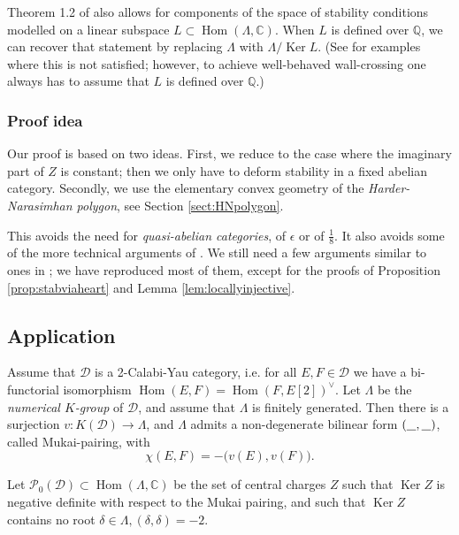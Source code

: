 \documentclass[leqno,11pt,twoside]{amsart}
\theoremstyle{definition}
\begin{document}
Theorem 1.2 of \cite{Bridgeland:Stab} also allows for components of the space of stability
conditions modelled on a linear subspace $L \subset {\mathop{\mathrm{Hom}}\nolimits}(\Lambda, {\ensuremath{\mathbb{C}}})$. When $L$ is defined over ${\ensuremath{\mathbb{Q}}}$, we can recover
that statement by replacing $\Lambda$ with $\Lambda/{\mathop{\mathrm{Ker}}\nolimits} L$.
(See \cite{Sven-Holger:quotcategories} for examples where this is not satisfied; however, 
to achieve well-behaved wall-crossing one always has to assume that $L$ is defined over ${\ensuremath{\mathbb{Q}}}$.)

\subsubsection*{Proof idea}
Our proof is based on two ideas. First, we reduce to the case where the imaginary part of $Z$
is constant; then we only have to deform stability in a fixed abelian
category. Secondly, we use the elementary convex geometry of the \emph{Harder-Narasimhan
polygon}, see Section \ref{sect:HNpolygon}.

This avoids the need for \emph{quasi-abelian categories}, of $\epsilon$ or of $\frac 18$. It also avoids some of the 
more technical arguments of \cite[Section 7]{Bridgeland:Stab}. We still need a few arguments
similar to ones in \cite{Bridgeland:Stab}; we have reproduced most of them,
except for the proofs of Proposition \ref{prop:stabviaheart} and Lemma
\ref{lem:locallyinjective}. 

\subsection*{Application}
Assume that ${\ensuremath{\mathcal D}}$ is a 2-Calabi-Yau category, i.e. for all $E, F \in {\ensuremath{\mathcal D}}$ we have a bi-functorial
isomorphism
${\mathop{\mathrm{Hom}}\nolimits}(E, F) = {\mathop{\mathrm{Hom}}\nolimits}(F, E[2])^\vee$. Let $\Lambda$ be the \emph{numerical
$K$-group} of ${\ensuremath{\mathcal D}}$, and assume that $\Lambda$ is finitely generated. Then
there is a surjection $v \colon K({\ensuremath{\mathcal D}}) \to \Lambda$, and $\Lambda$ admits a non-degenerate bilinear form $({\underline{\hphantom{A}}}, {\underline{\hphantom{A}}})$, called Mukai-pairing, with
\[ \chi(E, F) = -\bigl(v(E), v(F) \bigr). \]

Let ${\ensuremath{\mathcal P}}_0({\ensuremath{\mathcal D}}) \subset {\mathop{\mathrm{Hom}}\nolimits}(\Lambda, {\ensuremath{\mathbb{C}}})$ be the set of central charges $Z$ such that
${\mathop{\mathrm{Ker}}\nolimits} Z$ is negative definite with respect to the Mukai pairing, and such that ${\mathop{\mathrm{Ker}}\nolimits} Z$ contains
no root $\delta \in \Lambda, (\delta, \delta) = -2$. 
\end{document}
